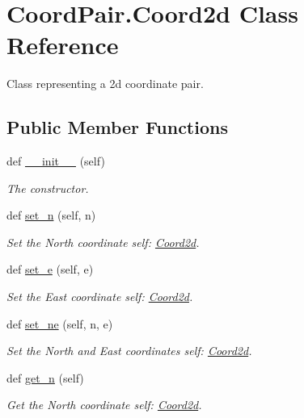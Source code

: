 \hypertarget{classCoordPair_1_1Coord2d}{}\section{Coord\+Pair.\+Coord2d Class Reference}
\label{classCoordPair_1_1Coord2d}


Class representing a 2d coordinate pair.  


\subsection*{Public Member Functions}
\begin{DoxyCompactItemize}
\item 
def \hyperlink{classCoordPair_1_1Coord2d_a9a06768e1ca4357128127ac72631142a}{\+\_\+\+\_\+init\+\_\+\+\_\+} (self)
\begin{DoxyCompactList}\small\item\em The constructor. \end{DoxyCompactList}\item 
def \hyperlink{classCoordPair_1_1Coord2d_a435a018897da527d8839db72d79147a6}{set\+\_\+n} (self, n)
\begin{DoxyCompactList}\small\item\em Set the North coordinate  self\+: \hyperlink{classCoordPair_1_1Coord2d}{Coord2d}. \end{DoxyCompactList}\item 
def \hyperlink{classCoordPair_1_1Coord2d_a7f4d5d5ab2c2f76d6b226a77f90cfa14}{set\+\_\+e} (self, e)
\begin{DoxyCompactList}\small\item\em Set the East coordinate  self\+: \hyperlink{classCoordPair_1_1Coord2d}{Coord2d}. \end{DoxyCompactList}\item 
def \hyperlink{classCoordPair_1_1Coord2d_ac5b1613fcd797bd5f613ad378ce3bbcb}{set\+\_\+ne} (self, n, e)
\begin{DoxyCompactList}\small\item\em Set the North and East coordinates  self\+: \hyperlink{classCoordPair_1_1Coord2d}{Coord2d}. \end{DoxyCompactList}\item 
def \hyperlink{classCoordPair_1_1Coord2d_a8d2fb363ed198be582db7a8b5838e29c}{get\+\_\+n} (self)
\begin{DoxyCompactList}\small\item\em Get the North coordinate  self\+: \hyperlink{classCoordPair_1_1Coord2d}{Coord2d}. \end{DoxyCompactList}\item 

\end{DoxyCompactItemize}
